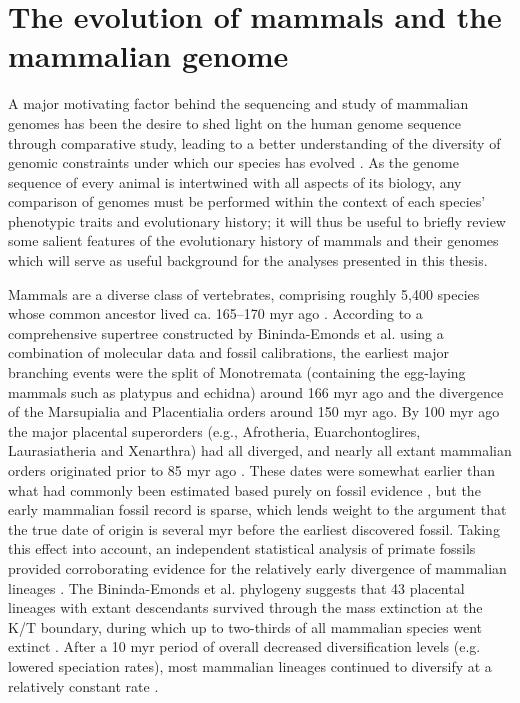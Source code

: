 \section{The evolution of mammals and the mammalian genome}

A major motivating factor behind the sequencing and study of mammalian
genomes has been the desire to shed light on the human genome sequence
through comparative study, leading to a better understanding of the
diversity of genomic constraints under which our species has evolved
\citep{Mouse2002Initial}. As the genome sequence of every animal is
intertwined with all aspects of its biology, any comparison of genomes
must be performed within the context of each species' phenotypic
traits and evolutionary history; it will thus be useful to briefly
review some salient features of the evolutionary history of mammals
and their genomes which will serve as useful background for the
analyses presented in this thesis.

Mammals are a diverse class of vertebrates, comprising roughly 5,400
species whose common ancestor lived ca. 165--170 \ac{myr} ago
\citep{Wilson2005}. According to a comprehensive supertree constructed
by Bininda-Emonds et al. using a combination of molecular data and
fossil calibrations, the earliest major branching events were the
split of Monotremata (containing the egg-laying mammals such as
platypus and echidna) around 166 \ac{myr} ago and the divergence of
the Marsupialia and Placentialia orders around 150 \ac{myr} ago. By
100 \ac{myr} ago the major placental superorders (e.g., Afrotheria,
Euarchontoglires, Laurasiatheria and Xenarthra) had all diverged, and
nearly all extant mammalian orders originated prior to 85 \ac{myr} ago
\citep{BinindaEmonds2007}. These dates were somewhat earlier than what
had commonly been estimated based purely on fossil evidence
\citep{Archibald2001}, but the early mammalian fossil record is
sparse, which lends weight to the argument that the true date of
origin is several \ac{myr} before the earliest discovered
fossil. Taking this effect into account, an independent statistical
analysis of primate fossils provided corroborating evidence for the
relatively early divergence of mammalian lineages
\citep{Martin2007}. The Bininda-Emonds et al. phylogeny suggests that
43 placental lineages with extant descendants survived through the
mass extinction at the K/T boundary, during which up to two-thirds of
all mammalian species went extinct \citep{Alroy1999}. After a 10
\ac{myr} period of overall decreased diversification levels
(e.g. lowered speciation rates), most mammalian lineages continued to
diversify at a relatively constant rate
\citep{BinindaEmonds2007,Martin2007}.

